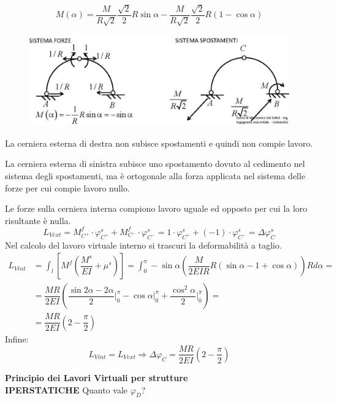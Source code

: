 \documentclass{article}
\begin{document}
\begin{adjustwidth}{2in}{}
		\[ M(\alpha) = \dfrac{M}{R\sqrt{2}}\dfrac{\sqrt{2}}{2}R\sin\alpha - \dfrac{M}{R\sqrt{2}}\dfrac{\sqrt{2}}{2}R(1-\cos\alpha)\]
		
\begin{figure}[H]
	\centering
	\includegraphics[width=0.7\linewidth]{"immagini/1.PARTE8_Pagina_67"}	
\end{figure}

		La cerniera esterna di destra non subisce spostamenti e quindi non compie lavoro.
		
		La cerniera esterna di sinistra subisce uno spostamento dovuto al cedimento nel sistema degli
		spostamenti, ma è ortogonale alla forza applicata nel sistema delle forze per cui compie lavoro nullo.
		
		Le forze sulla cerniera interna compiono lavoro uguale ed opposto per cui la loro risultante è nulla.
		\[L_{Vext} = M_{C^+}^f \cdot \varphi_{C^+}^s + M_{C^-}^f \cdot \varphi_{C^-}^s = 1 \cdot \varphi_{C^+}^s + (-1) \cdot \varphi_{C^-}^s = \Delta\varphi_C^s \]
		Nel calcolo del lavoro virtuale interno si trascuri la deformabilità a taglio. 
		\[ \begin{split}
		L_{Vint} & = \int_{l} \left[ M^f\left( \dfrac{M^s}{EI} +\mu^s \right)\right]  = \int_{0}^{\pi} -\sin\alpha \left( \dfrac{M}{2EIR}R(\sin\alpha - 1 +\cos\alpha) \right) Rd\alpha = \\ 
		& = \dfrac{MR}{2EI} \left( \dfrac{\sin2\alpha - 2\alpha}{2} \Bigr\rvert_{0}^{\pi} - \cos\alpha\Bigr\rvert_{0}^{\pi} + \dfrac{\cos^2\alpha}{2}\Bigr\rvert_{0}^{\pi} \right)  = \\
		& = \dfrac{MR}{2EI}\left( 2 - \dfrac{\pi}{2}\right) 
		\end{split}
		\]
		Infine:
		\[L_{Vint} = L_{Vext} \Rightarrow \Delta\varphi_C = \dfrac{MR}{2EI}\left( 2 - \dfrac{\pi}{2}\right)\]

{\Large \textbf{Principio dei Lavori Virtuali per strutture \\ IPERSTATICHE}} \newline 
		Quanto vale $\varphi_D$?
		

\end{adjustwidth}
\end{document}
